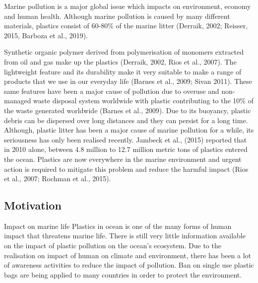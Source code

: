 \documentclass[10pt]{article}\usepackage[]{graphicx}\usepackage[]{color}
\begin{document}
Marine pollution is a major global issue which impacts on environment, economy and human health. Although marine pollution is caused by many different materials, plastics consist of 60-80\% of the marine litter (Derraik, 2002; Reisser, 2015, Barboza et al., 2019). 

Synthetic organic polymer derived from polymerisation of monomers extracted from oil and gas make up the plastics (Derraik, 2002, Rios et al., 2007). The lightweight feature and its durability make it very suitable to make a range of products that we use in our everyday life (Barnes et al., 2009; Sivan 2011). These same features have been a major cause of pollution due to overuse and non-managed waste disposal system worldwide with plastic contributing to the 10\% of the waste generated worldwide (Barnes et al., 2009). Due to its buoyancy, plastic debris can be dispersed over long distances and they can persist for a long time. Although, plastic litter has been a major cause of marine pollution for a while, its seriousness has only been realised recently. Jambeck et al., (2015) reported that in 2010 alone, between 4.8 million to 12.7 million metric tons of plastics entered the ocean. Plastics are now everywhere in the marine environment and urgent action is required to mitigate this problem and reduce the harmful impact (Rios et al., 2007; Rochman et al., 2015). 



\subsection{Motivation}\label{mot}

Impact on marine life
Plastics in ocean is one of the many forms of human impact that threatens marine life. There is still very little information available on the impact of plastic pollution on the ocean's ecosystem. Due to the realisation on impact of human on climate and environment, there has been a lot of awareness activities to reduce the impact of pollution. Ban on single use plastic bags are being applied to many countries in order to protect the environment. 
\end{document}
